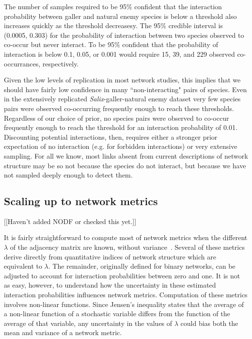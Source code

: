 \documentclass[12pt]{article}
\begin{document}
\begin{spacing}{2.0}
      The number of samples required to be 95\% confident that the interaction probability between galler and natural enemy species is below a threshold also increases quickly as the threshold decreasesy. The 95\% credible interval is (0.0005, 0.303) for the probability of interaction between two species observed to co-occur but never interact. To be 95\% confident that the probability of interaction is below 0.1, 0.05, or 0.001 would require 15, 39, and 229 observed co-occurrances, respectively.


      Given the low levels of replication in most network studies, this implies that we should have fairly low confidence in many ``non-interacting" pairs of species. Even in the extensively replicated \emph{Salix}-galler-natural enemy dataset very few species pairs were observed co-occurring frequently enough to reach these thresholds.  Regardless of our choice of prior, no species pairs were observed to co-occur frequently enough to reach the threshold for an interaction probability of 0.01. Discounting potential interactions, then, requires either a stronger prior expectation of no interaction (e.g. for forbidden interactions) or very extensive sampling. For all we know, most links absent from current descriptions of network structure may be so not because the species do not interact, but because we have not sampled deeply enough to detect them.


  \subsection*{Scaling up to network metrics}
  [[Haven't added NODF or checked this yet.]]


    It is fairly straightforward to compute most of network metrics when the different $\lambda$ of the adjacency matrix are known, without variance~\citep{Poisot2016}. Several of these metrics derive directly from quantitative indices of network structure which are equivalent to $\lambda$. The remainder, originally defined for binary networks, can be adjusted to account for interaction probabilities between zero and one. It is not as easy, however, to understand how the uncertainty in these estimated interaction probabilities influences network metrics. Computation of these metrics involves non-linear functions. Since Jensen's inequality states that the average of a non-linear function of a stochastic variable differs from the function of the average of that variable, any uncertainty in the values of $\lambda$ could bias both the mean and variance of a network metric.


\end{spacing}
\end{document}
